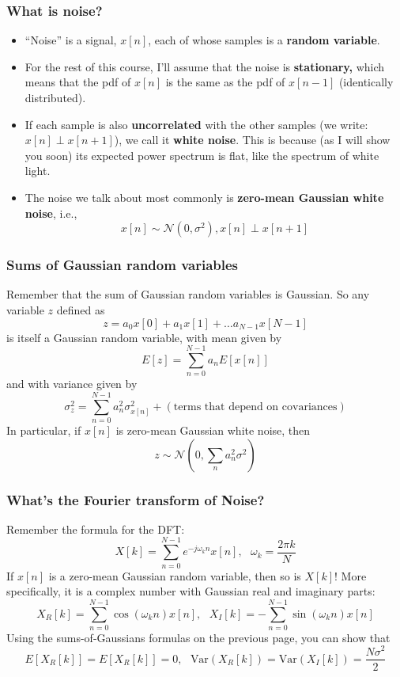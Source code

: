 \documentclass{beamer}
\begin{document}
\begin{frame}
  \frametitle{What is noise?}

  \begin{itemize}
    \item ``Noise'' is a signal, $x[n]$, each of whose samples is a
      {\bf random variable}.
    \item For the rest of this course, I'll assume that the noise is
      {\bf stationary,} which means that the pdf of $x[n]$ is the same
      as the pdf of $x[n-1]$ (identically distributed).
    \item If each sample is also {\bf uncorrelated} with the other
      samples (we write: $x[n]\perp x[n+1]$), we call it {\bf white
        noise}. This is because (as I will show you soon) its expected
      power spectrum is flat, like the spectrum of white light.
    \item The noise we talk about most commonly is {\bf zero-mean
      Gaussian white noise}, i.e.,
      \[
      x[n]\sim {\mathcal N}(0,\sigma^2), x[n]\perp x[n+1]
      \]
  \end{itemize}
\end{frame}

\begin{frame}
  \frametitle{Sums of Gaussian random variables}
  Remember that the sum of Gaussian random variables is Gaussian. So any variable $z$ defined as
  \[
  z = a_0 x[0]+a_1x[1]+\ldots a_{N-1}x[N-1]
  \]
  is itself a Gaussian random variable, with mean given by
  \[
  E[z] = \sum_{n=0}^{N-1} a_n E[x[n]]
  \]
  and with variance given by
  \[
  \sigma_z^2 = \sum_{n=0}^{N-1}a_n^2 \sigma_{x[n]}^2 + \left(\mbox{terms that depend on covariances}\right)
  \]
  In particular, if $x[n]$ is zero-mean Gaussian white noise, then
  \[
  z\sim {\mathcal N}(0,\sum_n a_n^2\sigma^2)
  \]
\end{frame}

\begin{frame}
  \frametitle{What's the Fourier transform of Noise?}

  Remember the formula for the DFT:
  \[
  X[k] =\sum_{n=0}^{N-1} e^{-j\omega_k n}x[n],~~~\omega_k=\frac{2\pi k}{N}
  \]
  If $x[n]$ is a zero-mean Gaussian random variable, then so is $X[k]$!
  More specifically, it is a complex number with Gaussian real and imaginary parts:
  \[
  X_R[k]=\sum_{n=0}^{N-1} \cos(\omega_k n)x[n],~~~
  X_I[k]=-\sum_{n=0}^{N-1} \sin(\omega_k n)x[n]
  \]
  Using the sums-of-Gaussians formulas on the previous page, you can show that
  \[
  E\left[X_R[k]\right]=E\left[X_R[k]\right]=0,~~~
  \mbox{Var}\left(X_R[k]\right)=\mbox{Var}\left(X_I[k]\right)=\frac{N\sigma^2}{2}
  \]
\end{frame}
\end{document}
